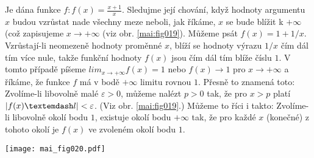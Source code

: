 \wikitextrule
\begin{example}\label{MAI:exam031}
  Je dána funkce \(f: f(x) = \frac{x + 1}{x}\). Sledujme její chování, když hodnoty argumentu \(x\) 
  budou vzrůstat 
  nade všechny meze neboli, jak říkáme, \(x\) se bude blížit k \(+\infty\) (což zapisujeme \(x \to 
  + \infty\) (viz obr. \ref{mai:fig019}). Můžeme psát \(f(x) = 1 + 1/x\). Vzrůstají-li neomezeně 
  hodnoty proměnné \(x\), blíží se hodnoty výrazu \(1/x\) čím dál tím více nule, takže funkční 
  hodnoty \(f(x)\) jsou čím dál tím blíže číslu \(1\). V tomto případě píšeme \(lim_{x\to+\infty} 
  f(x) = 1\) nebo \(f(x) \to 1\) pro \(x\to +\infty\) a říkáme, že funkce \(f\) má v bodě 
  \(+\infty\) limitu rovnou \(1\). Přesně to znamená toto: Zvolíme-li libovolně malé \(\varepsilon 
  > 0\), můžeme nalézt \(p > 0\) tak, že pro \(x > p\) platí \(\abs{f(x) — l} < \varepsilon\). (Viz 
  obr. \ref{mai:fig019}.) Můžeme to říci i takto: Zvolíme-li libovolně okolí bodu \(1\), existuje 
  okolí bodu \(+\infty\) tak, že pro každé \(x\) (konečné) z tohoto okolí je \(f(x)\) ve zvoleném 
  okolí bodu \(1\).
  
  {\centering
   \captionsetup{type=figure}
%   
   \texttt{[image: mai\_fig020.pdf]}
  \par}
\end{example}















